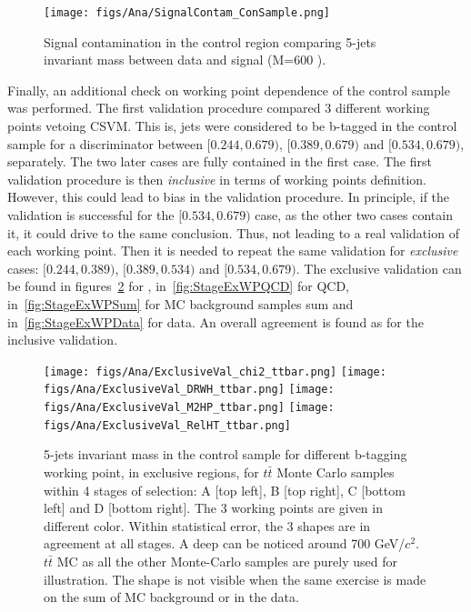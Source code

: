 \begin{figure}[!Hhtbp]
  \begin{center}
    \texttt{[image: figs/Ana/SignalContam\_ConSample.png]}
    \caption{Signal contamination in the control region comparing 5-jets invariant mass between data and signal (M=600 \GeVcc).}
    \label{fig:SigContamination}
  \end{center}
\end{figure}

Finally, an additional check on working point dependence of the control sample was performed. The first validation procedure compared 3 different working points vetoing CSVM. This is, jets were considered to be b-tagged in the control sample for a discriminator between $[0.244,0.679)$, $[0.389,0.679)$ and $[0.534,0.679)$, separately. The two later cases are fully contained in the first case. The first validation procedure is then \textit{inclusive} in terms of working points definition. However, this could lead to bias in the validation procedure. In principle, if the validation is successful for the $[0.534,0.679)$ case, as the other two cases contain it, it could drive to the same conclusion. Thus, not leading to a real validation of each working point. Then it is needed to repeat the same validation for \textit{exclusive} cases: $[0.244,0.389)$, $[0.389,0.534)$ and $[0.534,0.679)$. The exclusive validation can be found in figures~\ref{fig:StageExWPttbar} for \ttbar, in~\ref{fig:StageExWPQCD} for QCD, in~\ref{fig:StageExWPSum} for MC background samples sum and in~\ref{fig:StageExWPData} for data. An overall agreement is found as for the inclusive validation.

\begin{figure}[!Hhtbp]
  \begin{center}
    \texttt{[image: figs/Ana/ExclusiveVal\_chi2\_ttbar.png]}
    \texttt{[image: figs/Ana/ExclusiveVal\_DRWH\_ttbar.png]}
    \texttt{[image: figs/Ana/ExclusiveVal\_M2HP\_ttbar.png]}
    \texttt{[image: figs/Ana/ExclusiveVal\_RelHT\_ttbar.png]}
    \caption{5-jets invariant mass in the control sample for different b-tagging working point, in exclusive regions, for $t\bar{t}$ Monte Carlo samples within 4 stages of selection: A [top left], B [top right], C [bottom left] and D [bottom right]. The 3 working points are given in different color. Within statistical error, the 3 shapes are in agreement at all stages. A deep can be noticed around 700 GeV/$c^{2}$. $t\bar{t}$ MC as all the other Monte-Carlo samples are purely used for illustration. The shape is not visible when the same exercise is made on the sum of MC background or in the data.}
    \label{fig:StageExWPttbar}
  \end{center}
\end{figure}

